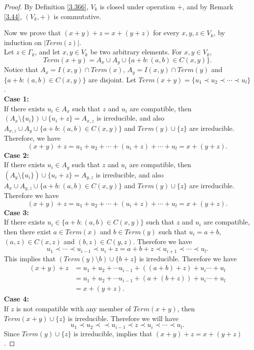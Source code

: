 \documentclass{amsart}
\theoremstyle{definition}
\theoremstyle{remark}
\numberwithin{equation}{section}
\begin{document}
\begin{proof}
	By Definition \ref{3.366}, $V_k$ is closed under operation $+$, and by Remark \ref{3.44}, $(V_k,+)$ is commutative.
	
	Now we prove that $(x+y)+z=x+(y+z)$ for every $x,y,z\in V_k$, by induction on $|Term(z)|$.\\
	Let $z\in \Gamma_k$, and let $x,y\in V_k$ be two arbitrary elements. For $x,y\in V_k$, 
	\[
	Term(x+y)=A_x\cup A_y\cup\{a+b:(a,b)\in C(x,y)\}.
	\]
	Notice that $A_x=I(x,y)\cap Term(x)$, $A_y=I(x,y)\cap Term(y)$ and $\{a+b:(a,b)\in C(x,y)\}$ are disjoint. Let $Term(x+y)=\{u_1\prec u_2\prec\cdots\prec u_l\}$.\\
	{\bf{ Case 1:}}\\
	If there exists $u_i\in A_x$ such that $z$ and $u_i$ are compatible, then $(A_x\setminus\{u_i\})\cup\{u_i+z\}=A_{x,z}$ is irreducible, and also  $A_{x,z}\cup A_y\cup\{a+b:(a,b)\in C(x,y)\}$  and $Term(y)\cup\{z\}$  are irreducible. Therefore, we have 
	\[
	(x+y)+z=u_1+u_2+\cdots+(u_i+z)+\cdots+u_l=x+(y+z).
	\]
	{\bf{ Case 2:}}\\	
	If there exists $u_i\in A_y$ such that $z$ and $u_i$ are compatible, then $(A_y\setminus\{u_i\})\cup\{u_i+z\}=A_{y,z}$ is irreducible, and also  $A_{x}\cup A_{y,z}\cup\{a+b:(a,b)\in C(x,y)\}$  and $Term(y)\cup\{z\}$  are irreducible. Therefore we have 
	\[
	(x+y)+z=u_1+u_2+\cdots+(u_i+z)+\cdots+u_l=x+(y+z).
	\]
	{\bf{ Case 3:}}\\	
	If there exists $u_i\in \{a+b:(a,b)\in C(x,y)\}$ such that $z$ and $u_i$ are compatible, then there exist $a\in Term(x)$ and $b\in Term(y)$ such that $u_i=a+b$, $(a,z)\in C(x,z)$ and $(b,z)\in C(y,z)$.  Therefore we have 
	\[
	u_1\prec\cdots\prec u_{i-1}\prec u_i+z=a+b+z\prec u_{i+1}\prec \cdots\prec u_l.
	\]
	This implies that $(Term(y)\setminus{b})\cup\{b+z\}$ is irreducible. Therefore we have 
	\begin{align*}
		(x+y)+z&=u_1+u_2+\cdots u_{i-1}+((a+b)+z)+u_{i}\cdots+u_l\\
		&=u_1+u_2+\cdots u_{i-1}+(a+(b+z))+u_{i}\cdots+u_l\\
		&=x+(y+z).
	\end{align*}	
	{\bf{ Case 4:}}\\	
	If $z$ is not compatible with any member of $Term(x+y)$, then $Term(x+y)\cup\{z\}$ is irreducible. Therefore we will have
	\[
	u_1\prec u_2\prec\prec u_{i-1}\prec z\prec u_i\prec\cdots\prec u_l.
	\]
	Since $Term(y)\cup\{z\}$ is irreducible, implies that $(x+y)+z=x+(y+z)$.
	

\end{proof}
\end{document}
